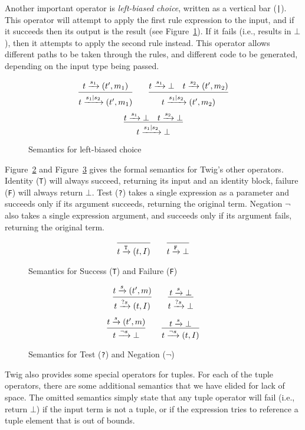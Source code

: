 Another important operator is \emph{left-biased choice}, written as a vertical bar (\texttt{|}). This operator will attempt to apply the first rule expression to the input, and if it succeeds then its output is the result (see Figure~\ref{fig:choice}). If it fails (i.e., results in $\bot$), then it attempts to apply the second rule instead. This operator allows different paths to be taken through the rules, and different code to be generated, depending on the input type being passed.

\begin{figure}[ht]
\[
\infer
  {t \arr{s_1|s_2} (t',m_1)}
  {t \arr{s_1} (t',m_1)}
\qquad
\infer
  {t \arr{s_1|s_2} (t',m_2)}
  {t \arr{s_1} \bot \quad t \arr{s_2} (t',m_2)}
\]
\[
\infer
  {t \arr{s_1|s_2} \bot}
  {t \arr{s_1} \bot \quad t \arr{s_2} \bot}
\]
\caption{Semantics for left-biased choice}
\label{fig:choice}
\end{figure}

Figure~\ref{fig:basic1} and Figure~\ref{fig:basic2} gives the formal semantics for Twig's other operators. Identity (\texttt{T}) will always succeed, returning its input and an identity block, failure (\texttt{F}) will always return \texttt{$\bot$}. Test (\texttt{?}) takes a single expression as a parameter and succeeds only if its argument succeeds, returning the original term. Negation \texttt{$\lnot$} also takes a single expression argument, and succeeds only if its argument fails, returning the original term.

\begin{figure}[ht]
\[
\infer
  {t \arr{\mathtt{T}} (t,I)}
  {}
\qquad
\infer
  {t \arr{\mathtt{F}} \bot}
  {}
\]
\caption{Semantics for Success (\texttt{T}) and Failure (\texttt{F})}
\label{fig:basic1}
\end{figure}

\begin{figure}[ht]
\[
\infer
  {t \arr{?s} (t,I)}
  {t \arr{s} (t',m)}
\qquad 
\infer
  {t \arr{?s} \bot}
  {t \arr{s} \bot}
\]
\[
\infer
  {t \arr{\lnot s} \bot}
  {t \arr{s} (t',m)}
\qquad 
\infer
  {t \arr{\lnot s} (t,I)}
  {t \arr{s} \bot}
\]
\caption{Semantics for Test (\texttt{?}) and Negation ($\lnot$)}
\label{fig:basic2}
\end{figure}

Twig also provides some special operators for tuples. For each of the tuple operators, there are some additional semantics that we have elided for lack of space. The omitted semantics simply state that any tuple operator will fail (i.e., return $\bot$) if the input term is not a tuple, or if the expression tries to reference a tuple element that is out of bounds.

